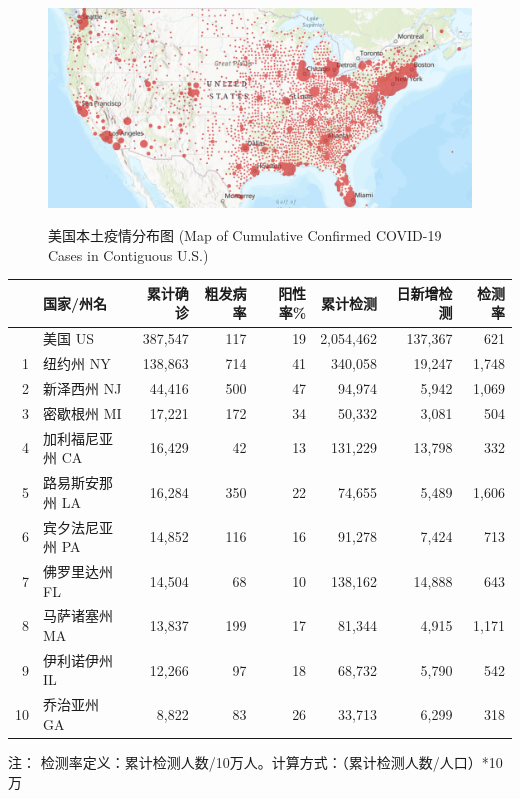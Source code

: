 \documentclass[]{article}
\begin{document}
\begin{figure}[H] 
\caption{美国本土疫情分布图 (Map of Cumulative Confirmed COVID-19 Cases in Contiguous U.S.)} %
\centering
\includegraphics[]{./input/covid4.png} %
\label{} %
\end{figure}

\begin{table}[H]
\vspace{-7mm}
    \caption{美国累计确诊前十位州}
      \vspace{-0.5\baselineskip}
      \centering \begin{table}[H]
\centering\begingroup\fontsize{12}{14}\selectfont

\begin{tabular}{rlrrrrrr}
\toprule
  & 国家/州名 & 累计确诊 & 粗发病率 & 阳性率\% & 累计检测 & 日新增检测 & 检测率\\
\midrule
\rowcolor{gray!6}   & 美国 US & 387,547 & 117 & 19 & 2,054,462 & 137,367 & 621\\
1 & 纽约州 NY & 138,863 & 714 & 41 & 340,058 & 19,247 & 1,748\\
\rowcolor{gray!6}  2 & 新泽西州 NJ & 44,416 & 500 & 47 & 94,974 & 5,942 & 1,069\\
3 & 密歇根州 MI & 17,221 & 172 & 34 & 50,332 & 3,081 & 504\\
\rowcolor{gray!6}  4 & 加利福尼亚州 CA & 16,429 & 42 & 13 & 131,229 & 13,798 & 332\\
5 & 路易斯安那州 LA & 16,284 & 350 & 22 & 74,655 & 5,489 & 1,606\\
\rowcolor{gray!6}  6 & 宾夕法尼亚州 PA & 14,852 & 116 & 16 & 91,278 & 7,424 & 713\\
7 & 佛罗里达州 FL & 14,504 & 68 & 10 & 138,162 & 14,888 & 643\\
\rowcolor{gray!6}  8 & 马萨诸塞州 MA & 13,837 & 199 & 17 & 81,344 & 4,915 & 1,171\\
9 & 伊利诺伊州 IL & 12,266 & 97 & 18 & 68,732 & 5,790 & 542\\
\rowcolor{gray!6}  10 & 乔治亚州 GA & 8,822 & 83 & 26 & 33,713 & 6,299 & 318\\
\bottomrule
\end{tabular}
\endgroup{}
\end{table} \begin{tablenotes}
    \fontsize{12}{12}
      \selectfont
    \item 注： 检测率定义：累计检测人数/10万人。计算方式：（累计检测人数/人口）*10万
    \end{tablenotes}
    \end{table}
\end{document}
